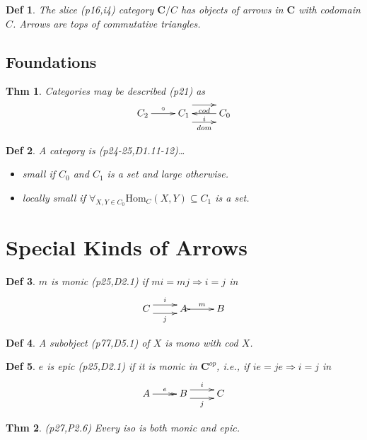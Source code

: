 \documentclass[10pt,twocolumn,letterpaper]{amsart}
\newtheorem{thm}{Thm}[section]
\newtheorem{dfn}{Def}[section]
\newcommand{\defn}[1]{\label{dfn:#1}{\em #1}}
\begin{document}
  \begin{dfn}The \defn{slice} (p16,i4) category $\mathbf{C}/C$ has objects
     of arrows in $\mathbf{C}$ with codomain $C$.  Arrows are tops of commutative triangles.
  \end{dfn}

  \subsection{Foundations}

  \begin{thm}Categories may be described (p21) as
     \[\xymatrix{ C_2 \ar[r]^\circ & C_1 \ar@<2ex>[r]_{cod} \ar@<-2ex>[r]_{dom} & C_0 \ar[l]^i }\]
  \end{thm}

  \begin{dfn}A category is (p24-25,D1.11-12)\dots
    \begin{itemize}
      \item \defn{small} if $C_0$ and $C_1$ is a set and \defn{large} otherwise.
      \item \defn{locally small} if $\forall_{X,Y \in C_0} \mbox{Hom}_C(X,Y) \subseteq C_1$ is a set.
    \end{itemize}
  \end{dfn}

\section{Special Kinds of Arrows}

  \begin{dfn}$m$ is \defn{monic} (p25,D2.1) if $mi = mj \Rightarrow i = j$ in
    \[\xymatrix{C \ar@<1ex>[r]^{i} \ar@<-1ex>[r]_j & A \ar@{>->}[r]^m & B} \]
  \end{dfn}

  \begin{dfn}A \defn{subobject} (p77,D5.1) of $X$ is mono with cod $X$.\end{dfn}

  \begin{dfn}$e$ is \defn{epic} (p25,D2.1) if it is monic in $\mathbf{C}^{op}$,
          {\it i.e.,} if $ie = je \Rightarrow i = j$ in
    \[\xymatrix{A \ar@{->>}[r]^e & B \ar@<1ex>[r]^{i} \ar@<-1ex>[r]_j & C} \]
  \end{dfn}

  \begin{thm}(p27,P2.6) Every iso is both monic and epic.\end{thm}
\end{document}
